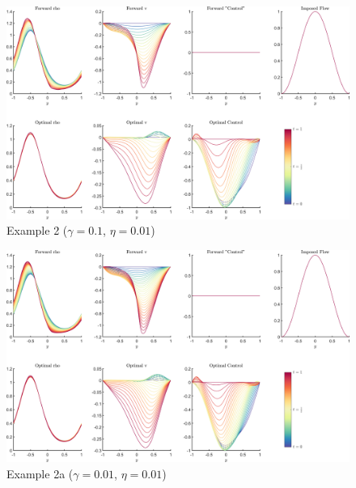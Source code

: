 \documentclass[11pt, a4paper]{article}
\theoremstyle{definition}
\begin{document}
    \begin{figure}
		\includegraphics[scale=0.05]{Example2.png}
		\caption{Example 2 ($\gamma = 0.1$, $\eta = 0.01$)}
		\label{fig2}
    \end{figure} 
    \begin{figure}
		\includegraphics[scale=0.05]{Example2a.png}
		\caption{Example 2a ($\gamma = 0.01$, $\eta = 0.01$)}
		\label{fig2a}
    \end{figure} 
\end{document}

